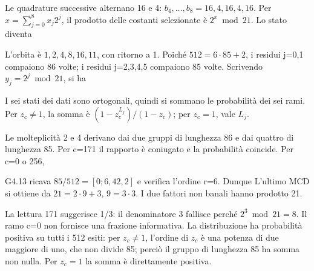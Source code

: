 \ExSolution


Le quadrature successive alternano 16 e 4: \(b_4,\ldots,b_8=16,4,16,4,16\). Per \(x=\sum_{j=0}^8x_j2^j\), il prodotto delle costanti selezionate è \(2^x\bmod21\). Lo stato diventa


L’orbita è \(1,2,4,8,16,11\), con ritorno a 1. Poiché \(512=6\cdot85+2\), i residui j=0,1 compaiono 86 volte; i residui j=2,3,4,5 compaiono 85 volte. Scrivendo \(y_j=2^j\bmod21\), si ha


I sei stati dei dati sono ortogonali, quindi si sommano le probabilità dei sei rami. Per \(z_c\ne1\), la somma è \((1-z_c^{L_j})/(1-z_c)\); per \(z_c=1\), vale \(L_j\).


Le molteplicità 2 e 4 derivano dai due gruppi di lunghezza 86 e dai quattro di lunghezza 85. Per c=171 il rapporto è coniugato e la probabilità coincide. Per c=0 o 256,


G4.13 ricava \(85/512=[0;6,42,2]\) e verifica l’ordine r=6. Dunque
L’ultimo MCD si ottiene da \(21=2\cdot9+3\), \(9=3\cdot3\). I due fattori non banali hanno prodotto 21.


La lettura 171 suggerisce 1/3: il denominatore 3 fallisce perché \(2^3\bmod21=8\). Il ramo c=0 non fornisce una frazione informativa. La distribuzione ha probabilità positiva su tutti i 512 esiti: per \(z_c\ne1\), l’ordine di \(z_c\) è una potenza di due maggiore di uno, che non divide 85; perciò il gruppo di lunghezza 85 ha somma non nulla. Per \(z_c=1\) la somma è direttamente positiva.

